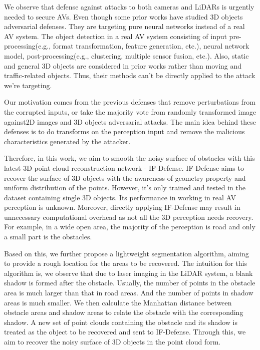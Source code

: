 We observe that defense against attacks to both cameras
and LiDARs is urgently needed to secure AVs. Even though
some prior works\cite{if-defense, 22, 24} have studied 3D objects adversarial defenses. They are targeting pure neural networks
instead of a real AV system. The object detection in a real AV
system consisting of input pre-processing(e.g., format transformation, feature generation, etc.), neural network model,
post-processing(e.g., clustering, multiple sensor fusion, etc.).
Also, static and general 3D objects are considered in prior
works rather than moving and traffic-related objects. Thus,
their methods can’t be directly applied to the attack we’re
targeting.

Our motivation comes from the previous defenses that remove perturbations from the corrupted inputs\cite{8, 14},
 or take the majority vote
from randomly transformed image\cite{12} against2D images and 3D objects adversarial attacks. 
The main idea behind these defenses is to do transforms on
the perception input and remove the malicious characteristics
generated by the attacker. 

Therefore, in this work, we aim to smooth the noisy surface of obstacles with this latest 3D point cloud reconstruction network - IF-Defense\cite{if-defense}.
IF-Defense\cite{if-defense} aims to recover the surface of 3D objects with the awareness of geometry property and uniform distribution of the points.
However, it's only trained and tested in the dataset containing single 3D objects.
Its performance in working in real AV perception is unknown.
Moreover, directly applying IF-Defense\cite{if-defense} may result in unnecessary computational overhead as 
not all the 3D perception needs recovery. 
For example, in a wide open area, the majority of the perception is road and only a small part is the obstacles.

Based on this, we further propose a lightweight segmentation algorithm, aiming to provide a rough location for the areas to be recovered.
The intuition for this algorithm is, we observe that due to laser imaging in the LiDAR system, a blank shadow is formed after the obstacle.
Usually, the number of points in the obstacle area is much larger than that in road areas.
And the number of points in shadow areas is much smaller.
We then calculate the Manhattan distance between obstacle areas and shadow areas to relate the obstacle with the corresponding shadow.
A new set of point clouds containing the obstacle and its shadow is treated as the object to be recovered and sent to IF-Defense\cite{if-defense}.
Through this, we aim to recover the noisy surface of 3D objects in the point cloud form.

